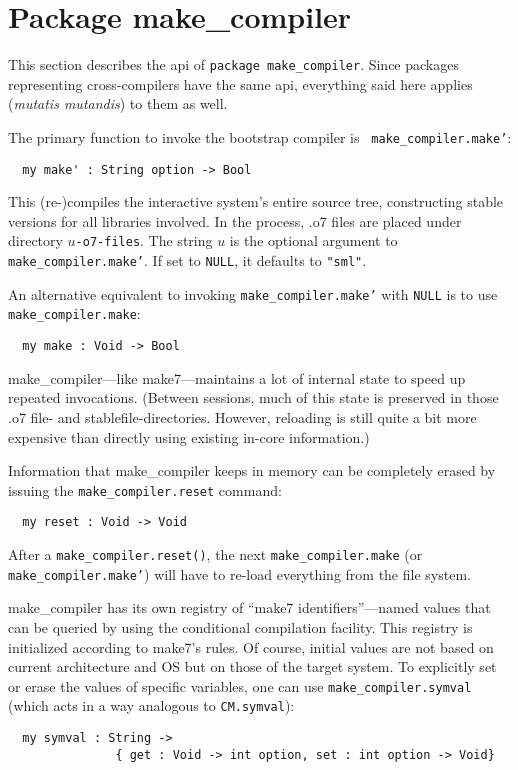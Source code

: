 
\section{Package make_compiler}

This section describes the api of {\tt package make_compiler}.  Since
packages representing cross-compilers have the same api,
everything said here applies ({\em mutatis mutandis}) to them as well.

The primary function to invoke the bootstrap compiler is {\tt
make_compiler.make'}:

\begin{verbatim}
  my make' : String option -> Bool
\end{verbatim}

This (re-)compiles the interactive system's entire source tree,
constructing stable versions for all libraries involved.  In the
process, .o7 files are placed under directory {\tt $u$-o7-files}.
The string $u$ is
the optional argument to {\tt make_compiler.make'}.  If set to {\tt NULL}, it
defaults to \verb|"sml"|.

An alternative equivalent to invoking {\tt make_compiler.make'} with {\tt NULL}
is to use {\tt make_compiler.make}:

\begin{verbatim}
  my make : Void -> Bool
\end{verbatim}

make_compiler---like make7---maintains a lot of internal state to speed up repeated
invocations.  (Between sessions, much of this state is preserved in
those .o7 file- and stablefile-directories.  However, reloading is
still quite a bit more expensive than directly using existing in-core
information.)

Information that make_compiler keeps in memory can be completely erased by
issuing the {\tt make_compiler.reset} command:

\begin{verbatim}
  my reset : Void -> Void
\end{verbatim}

After a {\tt make_compiler.reset()}, the next {\tt make_compiler.make} (or {\tt make_compiler.make'})
will have to re-load everything from the file system.

make_compiler has its own registry of ``make7 identifiers''---named values that can
be queried by using the conditional compilation facility.  This
registry is initialized according to make7's rules. Of course, initial
values are not based on current architecture and OS but on those of the
target system.  To explicitly set or erase the values of specific
variables, one can use {\tt make_compiler.symval} (which acts in a way analogous
to {\tt CM.symval}):

\begin{verbatim}
  my symval : String ->
               { get : Void -> int option, set : int option -> Void}
\end{verbatim}
